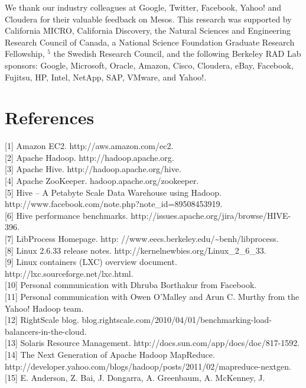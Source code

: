 \documentclass[
]{article}
\begin{document}
We thank our industry colleagues at Google, Twitter, Facebook, Yahoo!
and Cloudera for their valuable feedback on Mesos. This research was
supported by California MICRO, California Discovery, the Natural
Sciences and Engineering Research Council of Canada, a National Science
Foundation Graduate Research Fellowship, \(^{5}\) the Swedish Research
Council, and the following Berkeley RAD Lab sponsors: Google, Microsoft,
Oracle, Amazon, Cisco, Cloudera, eBay, Facebook, Fujitsu, HP, Intel,
NetApp, SAP, VMware, and Yahoo!.

\section{References}\label{references}

{[}1{]} Amazon EC2. http://aws.amazon.com/ec2.\\
{[}2{]} Apache Hadoop. http://hadoop.apache.org.\\
{[}3{]} Apache Hive. http://hadoop.apache.org/hive.\\
{[}4{]} Apache ZooKeeper. hadoop.apache.org/zookeeper.\\
{[}5{]} Hive -- A Petabyte Scale Data Warehouse using Hadoop.
http://www.facebook.com/note.php?note\_id=89508453919.\\
{[}6{]} Hive performance benchmarks.
http://issues.apache.org/jira/browse/HIVE-396.\\
{[}7{]} LibProcess Homepage. http:
//www.eecs.berkeley.edu/\textasciitilde benh/libprocess.\\
{[}8{]} Linux 2.6.33 release notes.
http://kernelnewbies.org/Linux\_2\_6\_33.\\
{[}9{]} Linux containers (LXC) overview document.
http://lxc.sourceforge.net/lxc.html.\\
{[}10{]} Personal communication with Dhruba Borthakur from Facebook.\\
{[}11{]} Personal communication with Owen O'Malley and Arun C. Murthy
from the Yahoo! Hadoop team.\\
{[}12{]} RightScale blog.
blog.rightscale.com/2010/04/01/benchmarking-load-balancers-in-the-cloud.\\
{[}13{]} Solaris Resource Management.
http://docs.sun.com/app/docs/doc/817-1592.\\
{[}14{]} The Next Generation of Apache Hadoop MapReduce.
http://developer.yahoo.com/blogs/hadoop/posts/2011/02/mapreduce-nextgen.\\
{[}15{]} E. Anderson, Z. Bai, J. Dongarra, A. Greenbaum, A. McKenney, J.
\end{document}

